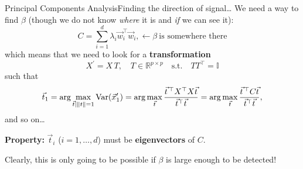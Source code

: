 \begin{frame}{Principal Components Analysis}{Finding the direction of signal\dots}
    We need a way to find $\beta$ (though we do not know \emph{where} it is  and \emph{if} we can see it):
    \begin{equation*}
        C
        =
        \sum\limits_{i = 1}^d \lambda_i \vec{w}_i^{\top} \vec{w}_i,
        \gets
        \beta~\text{is somewhere there}
    \end{equation*}
    which means that we need to look for a \textbf{transformation}
    \begin{equation*}
        X^{\prime} = X\, T,
        \quad
        T \in \mathbb{R}^{p \times p} \quad \text{s.t.} \quad T T^{\top} = \mathbb{I}
    \end{equation*}
    such that
    \begin{equation*}
        \vec{t}_1
        =
        \arg\max\limits_{\vec{t} \mid \norm{t} = 1}
        \operatorname{Var}(\vec{x}^{\prime}_1)
        =
        \arg\max\limits_{\vec{t}}
        \frac{\vec{t}^{\,\top} X^{\top} X \vec{t}}{\vec{t}^{\top} \vec{t}}
        =
        \arg\max\limits_{\vec{t}}
        \frac{\vec{t}^{\,\top} C \vec{t}}{\vec{t}^{\top} \vec{t}},
    \end{equation*}
    and so on\dots

    \vfill \pause

    \begin{center}
        \textbf{Property:} $\vec{t}_i$ ($i = 1, \dots, d$) must be \textbf{eigenvectors} of $C$.
    \end{center}

    \vfill

    {\tiny
        Clearly, this is only going to be possible if $\beta$ is large enough to be detected!
    }
\end{frame}

